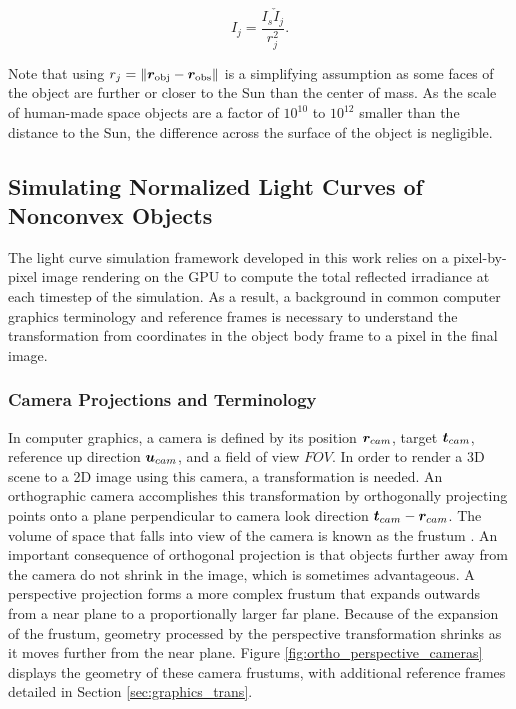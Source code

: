 \begin{equation} \label{eq:lc_func_norm_to_irrad}
  I_{j} = \frac{I_s \check{I}_j}{r_j^2}.
\end{equation}

Note that using $r_j = \| \bm{r}_\mathrm{obj} - \bm{r}_\mathrm{obs} \|$ is a simplifying assumption as some faces of the object are further or closer to the Sun than the center of mass. As the scale of human-made space objects are a factor of $10^{10}$ to $10^{12}$ smaller than the distance to the Sun, the difference across the surface of the object is negligible.

\subsection{Simulating Normalized Light Curves of Nonconvex Objects}

The light curve simulation framework developed in this work relies on a pixel-by-pixel image rendering on the GPU to compute the total reflected irradiance at each timestep of the simulation. As a result, a background in common computer graphics terminology and reference frames is necessary to understand the transformation from coordinates in the object body frame to a pixel in the final image.

\subsubsection{Camera Projections and Terminology}

In computer graphics, a camera is defined by its position $\bm{r}_{cam}$, target $\bm{t}_{cam}$, reference up direction $\bm{u}_{cam}$, and a field of view $FOV$. In order to render a 3D scene to a 2D image using this camera, a transformation is needed. An orthographic camera accomplishes this transformation by orthogonally projecting points onto a plane perpendicular to camera look direction $\bm{t}_{cam} - \bm{r}_{cam}$. The volume of space that falls into view of the camera is known as the frustum \cite{shirley2009}. An important consequence of orthogonal projection is that objects further away from the camera do not shrink in the image, which is sometimes advantageous. A perspective projection forms a more complex frustum that expands outwards from a near plane to a proportionally larger far plane. Because of the expansion of the frustum, geometry processed by the perspective transformation shrinks as it moves further from the near plane. Figure \ref{fig:ortho_perspective_cameras} displays the geometry of these camera frustums, with additional reference frames detailed in Section \ref{sec:graphics_trans}.

